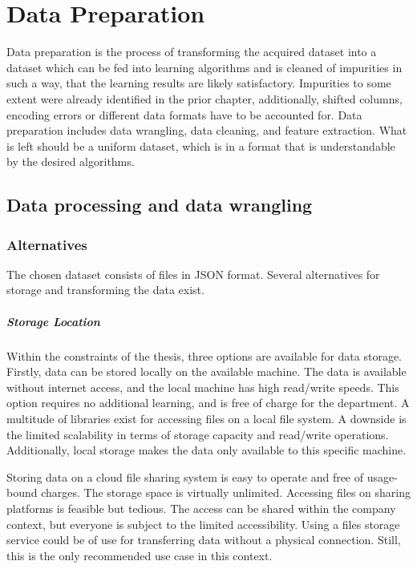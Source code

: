 \chapter{Data Preparation}
    Data preparation is the process of transforming the acquired dataset into a dataset which can be fed into learning algorithms and is cleaned of impurities in such a way, that the learning results are likely satisfactory. Impurities to some extent were already identified in the prior chapter, additionally, shifted columns, encoding errors or different data formats have to be accounted for.
	Data preparation includes data wrangling, data cleaning, and feature extraction. What is left should be a uniform dataset, which is in a format that is understandable by the desired algorithms.
	
	\section{Data processing and data wrangling}

        \subsection{Alternatives}
        The chosen dataset consists of files in \ac{JSON} format. Several alternatives for storage and transforming the data exist. 
        
        \paragraph{Storage Location}
        Within the constraints of the thesis, three options are available for data storage. Firstly, data can be stored locally on the available machine. The data is available without internet access, and the local machine has high read/write speeds. This option requires no additional learning, and is free of charge for the department. A multitude of libraries exist for accessing files on a local file system. A downside is the limited scalability in terms of storage capacity and read/write operations. Additionally, local storage makes the data only available to this specific machine.
        
        Storing data on a cloud file sharing system is easy to operate and free of usage-bound charges. The storage space is virtually unlimited. Accessing files on sharing platforms is feasible but tedious. The access can be shared within the company context, but everyone is subject to the limited accessibility. Using a files storage service could be of use for transferring data without a physical connection. Still, this is the only recommended use case in this context.
        
